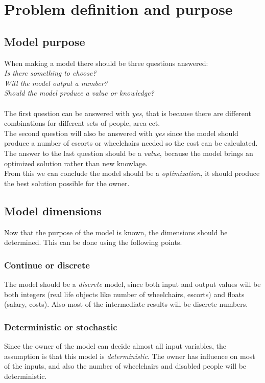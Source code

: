 \documentclass[a4paper, 11pt, notitlepage]{report}
\begin{document}
\section{Problem definition and purpose}
\subsection{Model purpose}
When making a model there should be three questions answered:\\
\emph{Is there something to choose?\\
Will the model output a number?\\
Should the model produce a value or knowledge?}\\\\
The first question can be answered with \emph{yes}, that is because there are different combinations for different sets of people, area ect.\\
The second question will also be answered with \emph{yes} since the model should produce a number of escorts or wheelchairs needed so the cost can be calculated.\\
The answer to the last question should be a \emph{value}, because the model brings an optimized solution rather than new knowlage.\\ From this we can conclude the model should be a \emph{optimization}, it should produce the best solution possible for the owner.
\subsection{Model dimensions}
Now that the purpose of the model is known, the dimensions should be determined. This can be done using the following points.
\subsubsection{Continue or discrete}
The model should be a \emph{discrete} model, since both input and output values will be both integers (real life objects like number of wheelchairs, escorts) and floats (salary, costs). Also most of the intermediate results will be discrete numbers.
\subsubsection{Deterministic or stochastic}
Since the owner of the model can decide almost all input variables, the assumption is that this model is \emph{deterministic}. The owner has influence on most of the inputs, and also the number of wheelchairs and disabled people will be deterministic.
\end{document}
